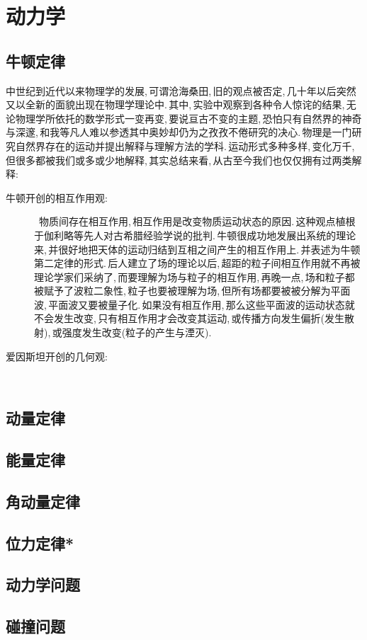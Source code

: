 \chapter{动力学}


\section{牛顿定律}

中世纪到近代以来物理学的发展,\,可谓沧海桑田,\,旧的观点被否定,\,几十年以后突然又以全新的面貌出现在物理学理论中.\,其中,\,实验中观察到各种令人惊诧的结果,\,无论物理学所依托的数学形式一变再变,\,要说亘古不变的主题,\,恐怕只有自然界的神奇与深邃,\,和我等凡人难以参透其中奥妙却仍为之孜孜不倦研究的决心.\,物理是一门研究自然界存在的运动并提出解释与理解方法的学科.\,运动形式多种多样,\,变化万千,\,但很多都被我们或多或少地解释,\,其实总结来看,\,从古至今我们也仅仅拥有过两类解释:

\begin{description}
	\item[牛顿开创的相互作用观:] \, 物质间存在相互作用,\,相互作用是改变物质运动状态的原因.\,这种观点植根于伽利略等先人对古希腊经验学说的批判.\,牛顿很成功地发展出系统的理论来,\,并很好地把天体的运动归结到互相之间产生的相互作用上.\,并表述为牛顿第二定律的形式.\,后人建立了场的理论以后,\,超距的粒子间相互作用就不再被理论学家们采纳了,\,而要理解为场与粒子的相互作用,\,再晚一点,\,场和粒子都被赋予了波粒二象性,\,粒子也要被理解为场,\,但所有场都要被被分解为平面波,\,平面波又要被量子化.\,如果没有相互作用,\,那么这些平面波的运动状态就不会发生改变,\,只有相互作用才会改变其运动,\,或传播方向发生偏折(发生散射),\,或强度发生改变(粒子的产生与湮灭).
	\item[爱因斯坦开创的几何观:] \, 
\end{description}

\section{动量定律}

\section{能量定律}

\section{角动量定律}

\section{位力定律*}

\section{动力学问题}

\section{碰撞问题}

